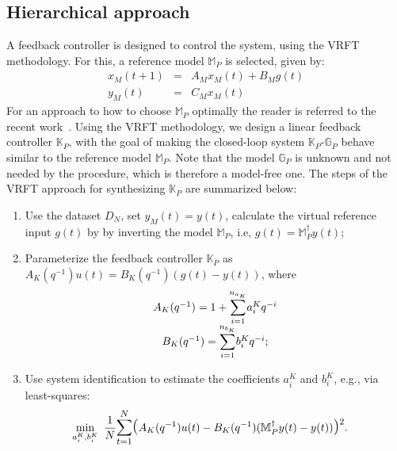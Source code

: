 \documentclass[letterpaper, 10 pt, conference]{ieeeconf}  %
\begin{document}
\subsection{Hierarchical approach}
A feedback controller is designed to control the system, using the VRFT methodology. For this, a reference model $\mathbb{M}_P$ is selected, given by:
	\begin{equation*}
\begin{array}{rcl}
	x_M(t+1) &=& A_Mx_M(t) + B_Mg(t)\\
	y_M(t) &=& C_Mx_M(t)
\end{array}
	\end{equation*}
For an approach to how to choose $\mathbb{M}_P$ optimally the reader is referred
to the recent work~\cite{SPB18}.
Using the VRFT methodology, we design a linear feedback controller $\mathbb{K}_P$, with the goal of making the closed-loop system $\mathbb{K}_P$-$\mathbb{G}_P$ behave similar to the reference model $\mathbb{M}_P$. Note that the model $\mathbb{G}_P$ is unknown and not needed by the procedure, which is therefore a model-free one. %
The steps of the VRFT approach for synthesizing $\mathbb{K}_P$ are summarized below:
\begin{enumerate}
	\item
	Use the dataset $D_N$, set $y_M(t)=y(t)$, calculate the virtual reference input $g(t)$ by by inverting the model $\mathbb{M}_P$, i.e, $g(t) = \mathbb{M}_P^{\dagger}y(t)$;
	\item
	Parameterize the feedback controller $\mathbb{K}_P$ as $A_K(q^{-1})u(t) = B_K(q^{-1})(g(t)-y(t))$, where 
	\begin{equation*}
	\begin{matrix}
	A_K(q^{-1}) = 1+\mathlarger{\sum\limits_{i=1}^{n_{a_K}}}a_i^Kq^{-i}\\
	B_K(q^{-1}) = \mathlarger{\sum\limits_{i=1}^{n_{b_K}}}b_i^Kq^{-i};
	\end{matrix}  
	\end{equation*}
	\item Use system identification to estimate the coefficients $a_i^K$ and $b_i^K$, e.g., via least-squares:
	\begin{equation}
	\small
	\begin{aligned}
	 \underset{a_i^K,b_i^K}{\text{min}}
	 & \hspace{5pt} \frac{1}{N}\mathlarger{\sum\limits_{t=1}^N}\mathlarger{\mathlarger{(}}A_K(q^{-1})u(t)-B_K(q^{-1})(\mathbb{M}_P^{\dagger}y(t)-y(t))\mathlarger{\mathlarger{)}}^2.
	\end{aligned}
	\label{VRFT_problem}
	\end{equation}
	\normalsize
\end{enumerate}
\end{document}
